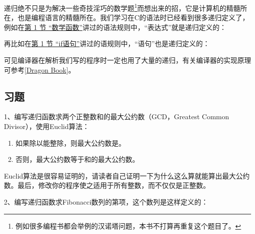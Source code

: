递归绝不只是为解决一些奇技淫巧的数学题\footnote[8]{例如很多编程书都会举例的汉诺塔问题，本书不打算再重复这个题目了。}而想出来的招，它是计算机的精髓所在，也是编程语言的精髓所在。我们学习在C的语法时已经看到很多递归定义了，例如在\hyperlink{db.ch03s01.id2712397}{第 1 节 “数学函数”}讲过的语法规则中，“表达式”就是递归定义的：


\begin{BookLiteral}
\end{BookLiteral}


再比如在\hyperlink{db.ch04s01.id2718043}{第 1 节 “if语句”}讲过的语规则中，“语句”也是递归定义的：


\begin{BookLiteral}
\end{BookLiteral}


可见编译器在解析我们写的程序时一定也用了大量的递归，有关编译器的实现原理可参考\hyperlink{db.bi01.bibli.dragonbook}{[Dragon Book]}。


\subsection*{习题}
%


1、编写递归函数求两个正整数和的最大公约数（GCD，Greatest Common Divisor），使用Euclid算法：


\begin{enumerate}

\item 如果除以能整除，则最大公约数是。

\item 否则，最大公约数等于和的最大公约数。
\end{enumerate}


Euclid算法是很容易证明的，请读者自己证明一下为什么这么算就能算出最大公约数。最后，修改你的程序使之适用于所有整数，而不仅仅是正整数。



2、编写递归函数求Fibonacci数列的第项，这个数列是这样定义的：



